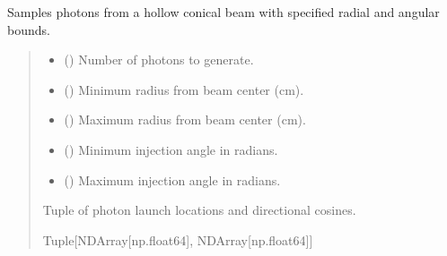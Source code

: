 \documentclass[letterpaper,10pt,english]{sphinxmanual}
\begin{document}

\begin{fulllineitems}
\label{\detokenize{generated/photon_canon.hardware:photon_canon.hardware.hollow_cone_beam}}
\pysigstartsignatures
\pysiglinewithargsret
{}
{\sphinxparamcomma {}\sphinxparamcomma {}\sphinxparamcomma {}\sphinxparamcomma {}}
{}
\pysigstopsignatures
\sphinxAtStartPar
Samples photons from a hollow conical beam with specified radial and angular bounds.
\begin{quote}\begin{description}
\begin{itemize}
\item {} 
\sphinxAtStartPar
{} () \textendash{} Number of photons to generate.

\item {} 
\sphinxAtStartPar
{} () \textendash{} Minimum radius from beam center (cm).

\item {} 
\sphinxAtStartPar
{} () \textendash{} Maximum radius from beam center (cm).

\item {} 
\sphinxAtStartPar
{} () \textendash{} Minimum injection angle in radians.

\item {} 
\sphinxAtStartPar
{} () \textendash{} Maximum injection angle in radians.

\end{itemize}

\sphinxAtStartPar
Tuple of photon launch locations and directional cosines.

\sphinxAtStartPar
Tuple{[}NDArray{[}np.float64{]}, NDArray{[}np.float64{]}{]}

\end{description}\end{quote}

\end{fulllineitems}
\end{document}
